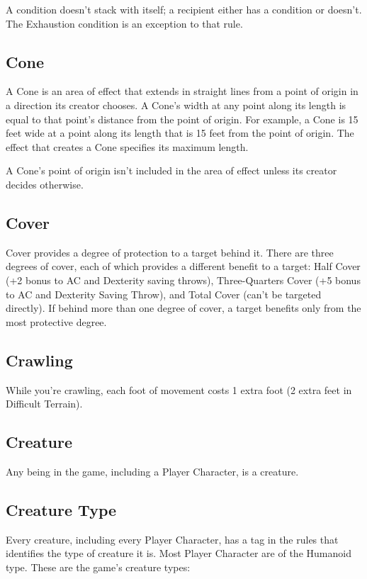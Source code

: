 \documentclass[10pt,a4paper,twoside,bg=print,twocolumn,openany,nodeprecatedcode]{dndarticle}
\begin{document}
A condition doesn't stack with itself; a recipient either has a condition or doesn't. The Exhaustion condition is an exception to that rule.

\subsection{Cone}
A Cone is an area of effect that extends in straight lines from a point of origin in a direction its creator chooses. A Cone's width at any point along its length is equal to that point's distance from the point of origin. For example, a Cone is 15 feet wide at a point along its length that is 15 feet from the point of origin. The effect that creates a Cone specifies its maximum length.

A Cone's point of origin isn't included in the area of effect unless its creator decides otherwise.

\subsection{Cover}
Cover provides a degree of protection to a target behind it. There are three degrees of cover, each of which provides a different benefit to a target: Half Cover (+2 bonus to AC and Dexterity saving throws), Three-Quarters Cover (+5 bonus to AC and Dexterity Saving Throw), and Total Cover (can't be targeted directly). If behind more than one degree of cover, a target benefits only from the most protective degree.

\subsection{Crawling}
While you're crawling, each foot of movement costs 1 extra foot (2 extra feet in Difficult Terrain).

\subsection{Creature}
Any being in the game, including a Player Character, is a creature.

\subsection{Creature Type}
Every creature, including every Player Character, has a tag in the rules that identifies the type of creature it is. Most Player Character are of the Humanoid type. These are the game's creature types:
\end{document}
